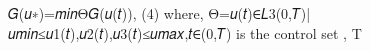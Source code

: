 𝐺(𝑢∗)=𝑚𝑖𝑛Θ𝐺(𝑢(𝑡)),                                                     (4)
where, Θ={𝑢(𝑡)∈𝐿3(0,𝑇)|𝑢𝑚𝑖𝑛≤𝑢1(𝑡),𝑢2(𝑡),𝑢3(𝑡)≤𝑢𝑚𝑎𝑥,𝑡∈(0,𝑇)} is the control set , T